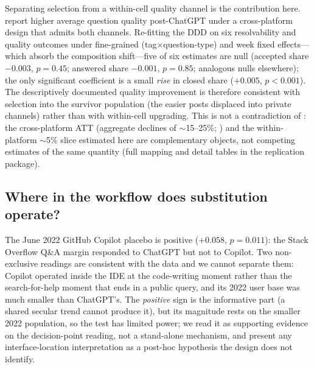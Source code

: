 Separating selection from a within-cell quality channel is the
contribution here. \citet{xue2026chatgpt} report higher average
question quality post-ChatGPT under a cross-platform design that
admits both channels. Re-fitting the DDD on six resolvability
and quality outcomes under fine-grained (tag$\times$question-type)
and week fixed effects---which absorb the composition shift---five
of six estimates are null (accepted share $-0.003$, $p=0.45$;
answered share $-0.001$, $p=0.85$; analogous nulls elsewhere);
the only significant coefficient is a small \emph{rise} in
closed share ($+0.005$, $p<0.001$). The descriptively documented
quality improvement is therefore consistent with selection into
the survivor population (the easier posts displaced into private
channels) rather than with within-cell upgrading. This is not a
contradiction of \citet{xue2026chatgpt}: the cross-platform ATT
(aggregate declines of $\sim$15--25\%;
\citealp{delriochanona2024large}) and the within-platform
$\sim$5\% slice estimated here are complementary objects, not
competing estimates of the same quantity (full mapping and
detail tables in the replication package).

\subsection{Where in the workflow does substitution
operate?}\label{ssec:mech_copilot}

The June 2022 GitHub Copilot placebo is positive ($+0.058$,
$p=0.011$): the Stack Overflow Q\&A margin responded to ChatGPT
but not to Copilot. Two non-exclusive readings are consistent
with the data and we cannot separate them: Copilot operated
inside the IDE at the code-writing moment rather than the
search-for-help moment that ends in a public query, and its 2022
user base was much smaller than ChatGPT's. The \emph{positive}
sign is the informative part (a shared secular trend cannot
produce it), but its magnitude rests on the smaller 2022
population, so the test has limited power; we read it as
supporting evidence on the decision-point reading, not a
stand-alone mechanism, and present any interface-location
interpretation as a post-hoc hypothesis the design does not
identify.
